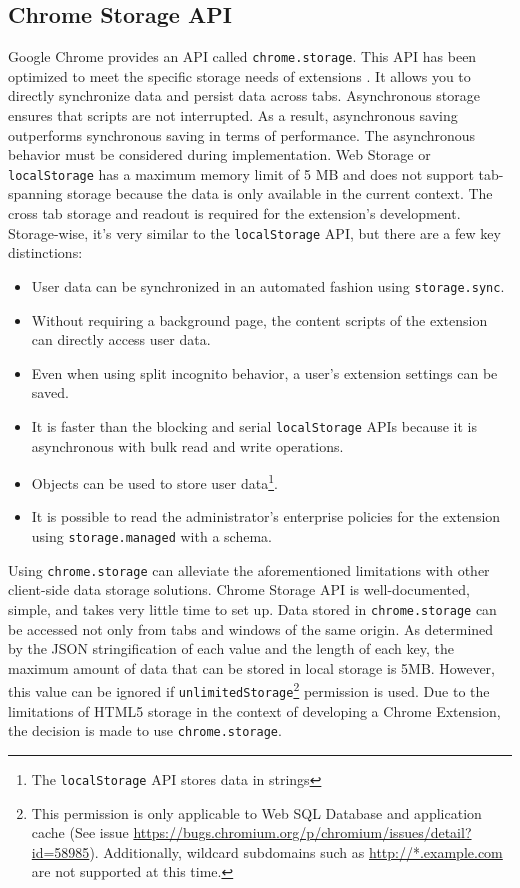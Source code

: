 \subsection*{Chrome Storage API}
Google Chrome provides an API called \texttt{chrome.storage}. This API has been optimized to meet the specific storage needs of extensions \autocite{chrome2021storage}. It allows you to directly synchronize data and persist data across tabs. Asynchronous storage ensures that scripts are not interrupted. As a result, asynchronous saving outperforms synchronous saving in terms of performance. The asynchronous behavior must be considered during implementation. Web Storage or \texttt{localStorage} has a maximum memory limit of 5 MB and does not support tab-spanning storage because the data is only available in the current context. The cross tab storage and readout is required for the extension's development. Storage-wise, it's very similar to the \texttt{localStorage} API, but there are a few key distinctions:

\begin{itemize}
  \item User data can be synchronized in an automated fashion using \texttt{storage.sync}.
  \item Without requiring a background page, the content scripts of the extension can directly access user data.
  \item Even when using split incognito behavior, a user's extension settings can be saved.
  \item It is faster than the blocking and serial \texttt{localStorage} APIs because it is asynchronous with bulk read and write operations.
  \item Objects can be used to store user data\footnote{The \texttt{localStorage} API stores data in strings}.
  \item It is possible to read the administrator's enterprise policies for the extension using \texttt{storage.managed} with a schema.
\end{itemize}

Using \texttt{chrome.storage} can alleviate the aforementioned limitations with other client-side data storage solutions. Chrome Storage API is well-documented, simple, and takes very little time to set up. Data stored in \texttt{chrome.storage} can be accessed not only from tabs and windows of the same origin. As determined by the JSON stringification of each value and the length of each key, the maximum amount of data that can be stored in local storage is 5MB. However, this value can be ignored if \texttt{unlimitedStorage}\footnote{This permission is only applicable to Web SQL Database and application cache (See issue \url{https://bugs.chromium.org/p/chromium/issues/detail?id=58985}). Additionally, wildcard subdomains such as \url{http://*.example.com} are not supported at this time.} permission is used. Due to the limitations of HTML5 storage in the context of developing a Chrome Extension, the decision is made to use \texttt{chrome.storage}.
